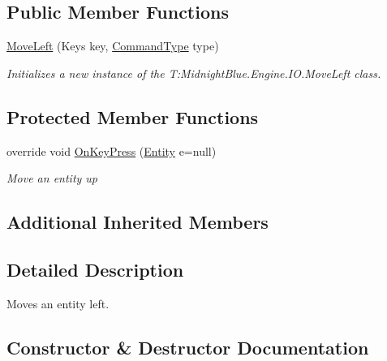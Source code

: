 \subsection*{Public Member Functions}
\begin{DoxyCompactItemize}
\item 
\hyperlink{class_midnight_blue_1_1_engine_1_1_i_o_1_1_move_left_a61e072106e307697bd526560dc0d8523}{Move\+Left} (Keys key, \hyperlink{namespace_midnight_blue_1_1_engine_1_1_i_o_a8bc3f159399ecadd590f7df1b54354b0}{Command\+Type} type)
\begin{DoxyCompactList}\small\item\em Initializes a new instance of the T\+:\+Midnight\+Blue.\+Engine.\+I\+O.\+Move\+Left class. \end{DoxyCompactList}\end{DoxyCompactItemize}
\subsection*{Protected Member Functions}
\begin{DoxyCompactItemize}
\item 
override void \hyperlink{class_midnight_blue_1_1_engine_1_1_i_o_1_1_move_left_aa5f056a72d45e8c335480c294c53b170}{On\+Key\+Press} (\hyperlink{class_midnight_blue_1_1_engine_1_1_entity_component_1_1_entity}{Entity} e=null)
\begin{DoxyCompactList}\small\item\em Move an entity up \end{DoxyCompactList}\end{DoxyCompactItemize}
\subsection*{Additional Inherited Members}


\subsection{Detailed Description}
Moves an entity left. 



\subsection{Constructor \& Destructor Documentation}
\hypertarget{class_midnight_blue_1_1_engine_1_1_i_o_1_1_move_left_a61e072106e307697bd526560dc0d8523}{}\label{class_midnight_blue_1_1_engine_1_1_i_o_1_1_move_left_a61e072106e307697bd526560dc0d8523} 
